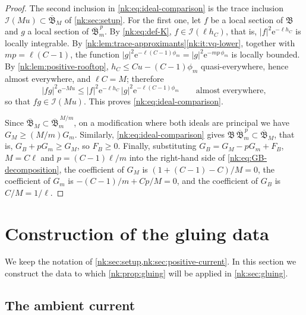 \begin{proof}
The second inclusion in \eqref{nk:eq:ideal-comparison} is the trace
inclusion $\mathcal I(Mu)\subset\overline{\mathfrak B}_M$ of \cref{nk:sec:setup}. For the
first one, let $f$ be
a local section of $\mathfrak B$ and $g$ a local section of
$\overline{\mathfrak B}_m^{\,p}$. By \eqref{nk:eq:def-K}, $f\in\mathcal I(\ell h_C)$, that is,
$|f|^2\mathrm{e}^{-\ell h_C}$ is locally integrable. By
\cref{nk:lem:trace-approximants}\ref{nk:it:vq-lower},
together with $mp=\ell(C-1)$, the function
$|g|^2\mathrm{e}^{-\ell(C-1)\phi_m}=|g|^2\mathrm{e}^{-mp\,\phi_m}$
is locally bounded.
By \cref{nk:lem:positive-rooftop}, $h_C\le Cu-(C-1)\phi_m$ quasi-everywhere,
hence almost everywhere, and $\ell C=M$; therefore
\[
  |fg|^2\mathrm{e}^{-Mu}\le|f|^2\mathrm{e}^{-\ell h_C}\,|g|^2\mathrm{e}^{-\ell(C-1)\phi_m}
  \qquad\text{almost everywhere},
\]
so that $fg\in\mathcal I(Mu)$. This proves \eqref{nk:eq:ideal-comparison}.

Since $\overline{\mathfrak B}_M\subset\overline{\mathfrak B}_m^{\,M/m}$, on a modification where
both ideals are principal we have $G_M\ge(M/m)G_m$. Similarly, \eqref{nk:eq:ideal-comparison} gives
$\mathfrak B\,\overline{\mathfrak B}_m^{\,p}\subset\overline{\mathfrak B}_M$, that is,
$G_B+pG_m\ge G_M$, so $F_B\ge0$. Finally, substituting
$G_B=G_M-pG_m+F_B$, $M=C\ell$ and $p=(C-1)\ell/m$ into the
right-hand side of \eqref{nk:eq:GB-decomposition}, the coefficient of
$G_M$ is $(1+(C-1)-C)/M=0$, the coefficient of $G_m$ is
$-(C-1)/m+Cp/M=0$, and the coefficient of $G_B$ is $C/M=1/\ell$.
\end{proof}

\section{Construction of the gluing data}\label{nk:sec:principalization}

We keep the notation of \cref{nk:sec:setup,nk:sec:positive-current}. In this
section we construct the data to which \cref{nk:prop:gluing} will be
applied in \cref{nk:sec:gluing}.

\subsection{The ambient current}\label{nk:sec:ambient}

